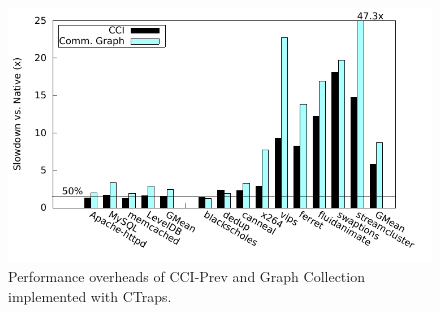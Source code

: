 \documentclass[pageno,nohyperref]{jpaper}
\newcommand{\ctraps}{CTraps\xspace}
\newcommand{\Caption}[1]{\begin{minipage}{.95\columnwidth} \caption{#1} \end{minipage} \vspace{-1.2ex}}
\begin{document}
\begin{figure}
\centering
\includegraphics[width=.9\columnwidth]{plots/appperf.pdf}
\Caption{\label{fig:perfapps}Performance overheads of CCI-Prev and Graph Collection implemented with \ctraps.}
\end{figure}
\end{document}
